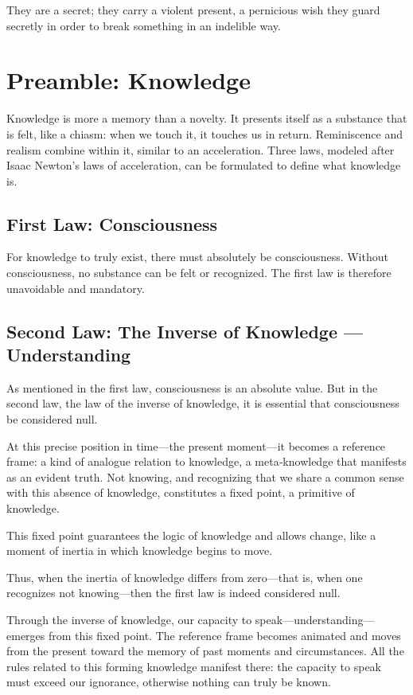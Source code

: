 \documentclass[12pt,oneside]{article}
\begin{document}
They are a secret; they carry a violent present, a pernicious wish they guard secretly in order to break something in an indelible way.

\section{Preamble: Knowledge}

Knowledge is more a memory than a novelty. It presents itself as a substance that is felt, like a chiasm: when we touch it, it touches us in return. Reminiscence and realism combine within it, similar to an acceleration. Three laws, modeled after Isaac Newton’s laws of acceleration, can be formulated to define what knowledge is.

\subsection{First Law: Consciousness}

For knowledge to truly exist, there must absolutely be consciousness. Without consciousness, no substance can be felt or recognized. The first law is therefore unavoidable and mandatory.

\subsection{Second Law: The Inverse of Knowledge — Understanding}

As mentioned in the first law, consciousness is an absolute value. But in the second law, the law of the inverse of knowledge, it is essential that consciousness be considered null.

At this precise position in time—the present moment—it becomes a reference frame: a kind of analogue relation to knowledge, a meta‑knowledge that manifests as an evident truth. Not knowing, and recognizing that we share a common sense with this absence of knowledge, constitutes a fixed point, a primitive of knowledge.

This fixed point guarantees the logic of knowledge and allows change, like a moment of inertia in which knowledge begins to move.

Thus, when the inertia of knowledge differs from zero—that is, when one recognizes not knowing—then the first law is indeed considered null.

Through the inverse of knowledge, our capacity to speak—understanding—emerges from this fixed point. The reference frame becomes animated and moves from the present toward the memory of past moments and circumstances. All the rules related to this forming knowledge manifest there: the capacity to speak must exceed our ignorance, otherwise nothing can truly be known.
\end{document}
